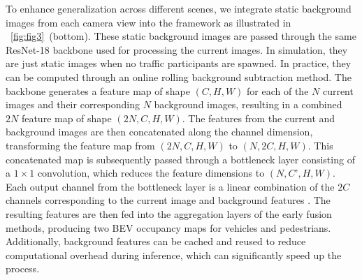 To enhance generalization across different scenes, we integrate static background images from each camera view into the framework as illustrated in \figureautorefname~\ref{fig:fig3}~(bottom). These static background images are passed through the same ResNet-18 backbone used for processing the current images. In simulation, they are just static images when no traffic participants are spawned. In practice, they can be computed through an online rolling background subtraction method. The backbone generates a feature map of shape $(C, H, W)$ for each of the $N$ current images and their corresponding $N$ background images, resulting in a combined $2N$ feature map of shape $(2N, C, H, W)$. The features from the current and background images are then concatenated along the channel dimension, transforming the feature map from $(2N, C, H, W)$ to $(N, 2C, H, W)$. This concatenated map is subsequently passed through a bottleneck layer consisting of a $1\times1$ convolution, which reduces the feature dimensions to $(N, C’, H, W)$. Each output channel from the bottleneck layer is a linear combination of the $2C$ channels corresponding to the current image and background features \cite{lin2013network}. The resulting features are then fed into the aggregation layers of the early fusion methods, producing two BEV occupancy maps for vehicles and pedestrians. Additionally, background features can be cached and reused to reduce computational overhead during inference, which can significantly speed up the process.
